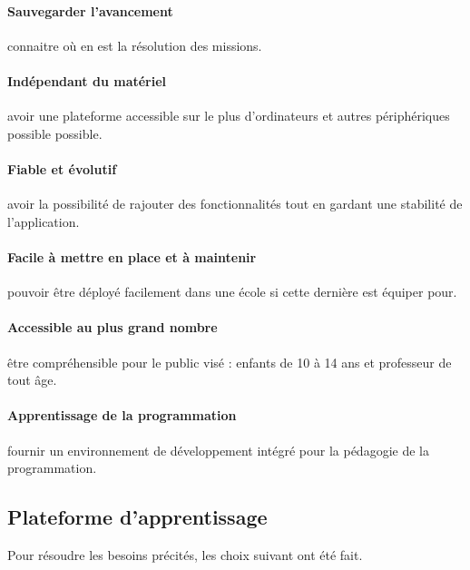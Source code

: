 \paragraph{Sauvegarder l'avancement} connaitre où en est la résolution des missions.
\paragraph{Indépendant du matériel} avoir une plateforme accessible sur le plus d'ordinateurs et autres périphériques possible possible.
\paragraph{Fiable et évolutif} avoir la possibilité de rajouter des fonctionnalités tout en gardant une stabilité de l'application.
\paragraph{Facile à mettre en place et à maintenir} pouvoir être déployé facilement dans une école si cette dernière est équiper pour.
\paragraph{Accessible au plus grand nombre} être compréhensible pour le public visé : enfants de 10 à 14 ans et professeur de tout âge.
\paragraph{Apprentissage de la programmation} fournir un environnement de développement intégré pour la pédagogie de la programmation.

\subsection{Plateforme d'apprentissage}
Pour résoudre les besoins précités, les choix suivant ont été fait.

